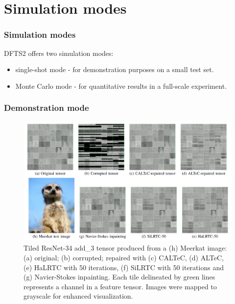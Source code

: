\documentclass[aspectratio=169]{beamer}
\begin{document}
\section{Simulation modes}
\begin{frame}
\frametitle{Simulation modes}
DFTS2 offers two simulation modes:
	\begin{itemize}
		\item single-shot mode - for demonstration purposes on a small test set.
		\item Monte Carlo mode - for quantitative results in a full-scale experiment.
	\end{itemize}
\end{frame}

\begin{frame}
\frametitle{Demonstration mode}
	\begin{figure}[H]
		\centering
		\includegraphics[scale=0.33]{vcipfig.png}
		\caption{Tiled ResNet-34 add\_3 tensor produced from a (h) Meerkat image: (a) original; (b) corrupted; repaired with (c) CALTeC, (d) ALTeC, (e) HaLRTC with 50 iterations, (f) SiLRTC with 50 iterations and (g) Navier-Stokes inpainting. Each tile delineated by green lines represents a channel in a feature tensor. Images were mapped to grayscale for enhanced visualization.}
	\end{figure}
\end{frame}
\end{document}
